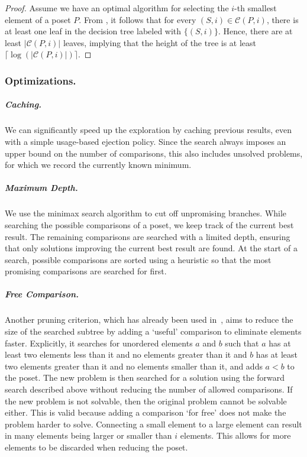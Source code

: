 \documentclass[a4paper,UKenglish,cleveref, autoref, thm-restate, anonymous]{lipics-v2021}
\begin{document}
\begin{proof}
  Assume we have an optimal algorithm for selecting the $i$-th smallest element of a poset $P$.
  From , it follows that for every $(S, i) \in \mathcal{C}(P, i)$, there is at least one leaf in the decision tree labeled with $\{(S, i)\}$.
  Hence, there are at least $|\mathcal{C}(P, i)|$ leaves, implying that the height of the tree is at least $\lceil\log(|\mathcal{C}(P, i)|)\rceil$.
\end{proof}

\subsubsection{Optimizations.}

\subparagraph{Caching.}
We can significantly speed up the exploration by caching previous results, even with a simple usage-based ejection policy.
Since the search always imposes an upper bound on the number of comparisons, this also includes unsolved problems, for which we record the currently known minimum.

\subparagraph{Maximum Depth.}
We use the minimax search algorithm to cut off unpromising branches.
While searching the possible comparisons of a poset, we keep track of the current best result.
The remaining comparisons are searched with a limited depth, ensuring that only solutions improving the current best result are found.
At the start of a search, possible comparisons are sorted using a heuristic so that the most promising comparisons are searched for first.

\subparagraph{Free Comparison.}
Another pruning criterion, which has already been used in~\cite{Oksanen}, aims to reduce the size of the searched subtree by adding a `useful' comparison to eliminate elements faster.
Explicitly, it searches for unordered elements $a$ and $b$ such that $a$ has at least two elements less than it and no elements greater than it and $b$ has at least two elements greater than it and no elements smaller than it, and adds $a < b$ to the poset.
The new problem is then searched for a solution using the forward search described above without reducing the number of allowed comparisons.
If the new problem is not solvable, then the original problem cannot be solvable either.
This is valid because adding a comparison `for free' does not make the problem harder to solve.
Connecting a small element to a large element can result in many elements being larger or smaller than $i$ elements.
This allows for more elements to be discarded when reducing the poset.
\end{document}
